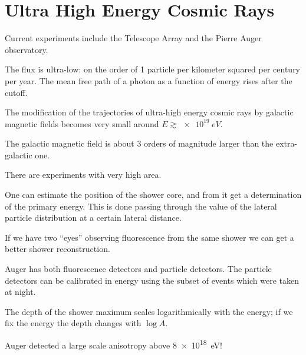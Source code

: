 \documentclass[main.tex]{subfiles}
\begin{document}
\section{Ultra High Energy Cosmic Rays}


Current experiments include the Telescope Array and the Pierre Auger observatory. 

The flux is ultra-low: on the order of 1 particle per kilometer squared per
century per year.
The mean free path of a photon as a function of energy rises after the cutoff. 

The modification of the trajectories of ultra-high energy cosmic rays 
by galactic magnetic fields becomes very small around \(E \gtrsim \SI{e19}{eV}\).

The galactic magnetic field is about 3 orders of magnitude larger than the extra-galactic one. 

There are experiments with very high area. 

One can estimate the position of the shower core, and from it get a 
determination of the primary energy. 
This is done passing through the value of the lateral particle distribution 
at a certain lateral distance. 

If we have two ``eyes'' observing fluorescence from  the same shower we can get a better 
shower reconstruction.  

Auger has both fluorescence detectors and particle detectors.
The particle detectors can be calibrated in energy using the subset of events 
which were taken at night. 

The depth of the shower maximum scales logarithmically with the energy;
if we fix the energy the depth changes with \(\log A\). 

Auger detected a large scale anisotropy above \SI{8e18}{eV}!
\end{document}
